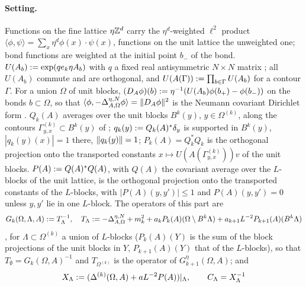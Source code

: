 \paragraph{Setting.} Functions on the fine lattice $\eta\mathbb Z^d$ carry the $\eta^d$-weighted $\ell^2$ product $\langle\phi,\psi\rangle=\sum_x\eta^d\phi(x)\cdot\psi(x)$, functions on the unit lattice the unweighted one; bond functions are weighted at the initial point $b_-$ of the bond. $U(A_b):=\exp(qe_k\eta A_b)$ with $q$ a fixed real antisymmetric $N\times N$ matrix \cite[(1.2)]{Ba4}; all $U(A_b)$ commute and are orthogonal, and $U(A(\Gamma)):=\prod_{b\in\Gamma}U(A_b)$ for a contour $\Gamma$. For a union $\Omega$ of unit blocks, $(D_A\phi)(b):=\eta^{-1}(U(A_b)\phi(b_+)-\phi(b_-))$ on the bonds $b\subset\Omega$, so that $\langle\phi,-\Delta^{\eta,N}_{A,\Omega}\phi\rangle=\lVert D_A\phi\rVert^2$ is the Neumann covariant Dirichlet form \cite[(1.3)]{Ba4}. $Q_k(A)$ averages over the unit blocks $B^k(y)$, $y\in\Omega^{(k)}$, along the contours $\Gamma^{(k)}_{y,x}\subset B^k(y)$ of \cite[(2.1)--(2.2)]{Ba1}; $q_k(y):= Q_k(A)^*\delta_y$ is supported in $B^k(y)$, $|q_k(y)(x)|=1$ there, $\lVert q_k(y)\rVert=1$; $P_k(A)=Q_k^*Q_k$ is the orthogonal projection onto the transported constants $x\mapsto U(A(\Gamma^{(k)}_{y,x}))v$ of the unit blocks. $P(A):= Q(A)^*Q(A)$, with $Q(A)$ the covariant average over the $L$-blocks of the unit lattice, is the orthogonal projection onto the transported constants of the $L$-blocks, with $|P(A)(y,y')|\le1$ and $P(A)(y,y')=0$ unless $y,y'$ lie in one $L$-block. The operators of this part are
\[
G_k(\Omega,\Lambda,A):= T_\Lambda^{-1},\quad T_\Lambda:=-\Delta^{\eta,N}_{A,\Omega}+m_k^2+a_kP_k(A)(\Omega\setminus B^k\Lambda)+a_{k+1}L^{-2}P_{k+1}(A)(B^k\Lambda)
\]
\cite[(3.5)]{Ba4}, for $\Lambda\subset\Omega^{(k)}$ a union of $L$-blocks ($P_k(A)(Y)$ is the sum of the block projections of the unit blocks in $Y$, $P_{k+1}(A)(Y)$ that of the $L$-blocks), so that $T_\emptyset=G_k(\Omega,A)^{-1}$ and $T_{\Omega^{(k)}}$ is the operator of $G^\eta_{k+1}(\Omega,A)$; and
\[
X_\Lambda:=(\Delta^{(k)}(\Omega,A)+aL^{-2}P(A))|_\Lambda,\qquad C_\Lambda=X_\Lambda^{-1}
\]
